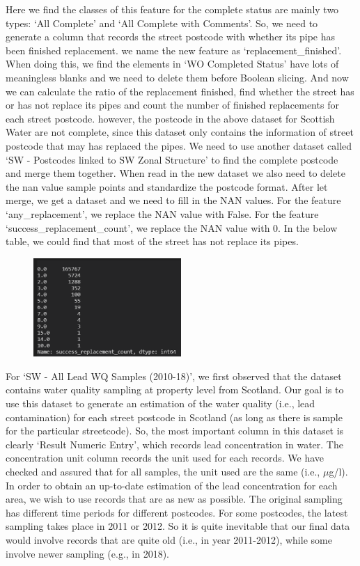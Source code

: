 \documentclass[11pt,twoside]{article}
\numberwithin{Theorem}{section}
\numberwithin{Definition}{section}
\numberwithin{Lemma}{section}
\numberwithin{Algorithm}{section}
\numberwithin{equation}{section}
\begin{document}
Here we find the classes of this feature for the complete status are mainly two types: ‘All Complete’ and ‘All Complete with Comments’. So, we need to generate a column that records the street postcode with whether its pipe has been finished replacement. we name the new feature as ‘replacement\_finished’. When doing this, we find the elements in ‘WO Completed Status’ have lots of meaningless blanks and we need to delete them before Boolean slicing. And now we can calculate the ratio of the replacement finished, find whether the street has or has not replace its pipes and count the number of finished replacements for each street postcode. however, the postcode in the above dataset for Scottish Water are not complete, since this dataset only contains the information of street postcode that may has replaced the pipes. We need to use another dataset called ‘SW - Postcodes linked to SW Zonal Structure’ to find the complete postcode and merge them together. When read in the new dataset we also need to delete the nan value sample points and standardize the postcode format. After let merge, we get a dataset and we need to fill in the NAN values. For the feature ‘any\_replacement’, we replace the NAN value with False. For the feature ‘success\_replacement\_count’, we replace the NAN value with 0. In the below table, we could find that most of the street has not replace its pipes.

\begin{figure}[!ht]
    \centering
    \includegraphics[width=0.5\textwidth]{p11.png}
    \end{figure}

For `SW - All Lead WQ Samples (2010-18)', we first observed that the dataset contains water quality sampling at property level from Scotland. Our goal is to use this dataset to generate an estimation of the water quality (i.e., lead contamination) for each street postcode in Scotland (as long as there is sample for the particular streetcode). So, the most important column in this dataset is clearly `Result Numeric Entry', which records lead concentration in water. The concentration unit column records the unit used for each records. We have checked and assured that for all samples, the unit used are the same (i.e., $\mu$g/l).
In order to obtain an up-to-date estimation of the lead concentration for each area, we wish to use records that are as new as possible. The original sampling has different time periods for different postcodes. For some postcodes, the latest sampling takes place in 2011 or 2012. So it is quite inevitable that our final data would involve records that are quite old (i.e., in year 2011-2012), while some involve newer sampling (e.g., in 2018).
\end{document}
